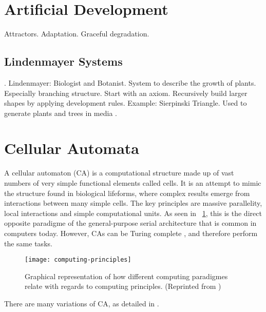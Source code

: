 
\section{Artificial Development}

\TODO
Attractors.
Adaptation.
Graceful degradation.

\subsection{Lindenmayer Systems}

\TODO
\cite{prusinkiewicz1990lindenmayer}.
Lindenmayer: Biologist and Botanist.
System to describe the growth of plants.
Especially branching structure.
Start with an axiom.
Recursively build larger shapes by applying development rules.
Example: Sierpinski Triangle.
Used to generate plants and trees in media \CN.


\section{Cellular Automata}

A cellular automaton (CA) is a computational structure made up of vast numbers of very simple functional elements called cells.
It is an attempt to mimic the structure found in biological lifeforms, where complex results emerge from interactions between many simple cells.
The key principles are massive parallelity, local interactions and simple computational units.
As seen in \figurename~\ref{fig:computing-principles}, this is the direct opposite paradigme of the general-purpose serial architecture that is common in computers today.
However, CAs can be Turing complete \cite{neumann1966selfreplication, codd1968cellular}, and therefore perform the same tasks.

\begin{figure}[!ht]
    \centering
    \texttt{[image: computing-principles]}
    \caption[Computing principles]{
        Graphical representation of how different computing paradigmes relate with regards to computing principles.
        (Reprinted from \cite{sipper1999emergence})
    }
    \label{fig:computing-principles}
\end{figure}

There are many variations of CA, as detailed in \cite{sipper1999emergence}.

